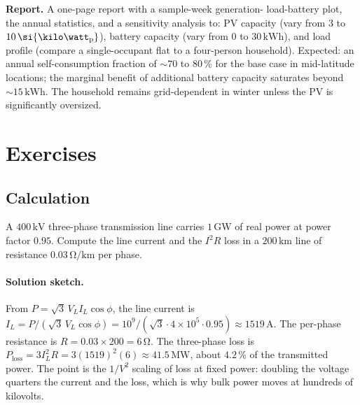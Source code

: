 \begin{project}
\textbf{Report.} A one-page report with a sample-week generation-
load-battery plot, the annual statistics, and a sensitivity analysis
to: PV capacity (vary from $3$ to $10\,\si{\kilo\watt
\textsubscript{p}}$), battery capacity (vary from $0$ to $30\,\si{
\kilo\watt\hour}$), and load profile (compare a single-occupant flat
to a four-person household). Expected: an annual self-consumption
fraction of $\sim 70$ to $80\,\%$ for the base case in mid-latitude
locations; the marginal benefit of additional battery capacity
saturates beyond $\sim 15\,\si{\kilo\watt\hour}$. The household
remains grid-dependent in winter unless the PV is significantly
oversized.
\end{project}

\section{Exercises}

\subsection*{Calculation}

\begin{exercise}
A $400\,\si{\kilo\volt}$ three-phase transmission line carries
$1\,\si{\giga\watt}$ of real power at power factor $0.95$. Compute
the line current and the $I^{2}R$ loss in a $200\,\si{\kilo\meter}$
line of resistance $0.03\,\si{\ohm\per\kilo\meter}$ per phase.
\paragraph{Solution sketch.}
From $P = \sqrt{3}\,V_L I_L \cos\phi$, the line current is $I_L =
P/(\sqrt{3}\,V_L\cos\phi) = 10^9/(\sqrt{3}\cdot 4\times10^5\cdot 0.95)
\approx 1519\,\si{\ampere}$. The per-phase resistance is $R = 0.03
\times 200 = 6\,\si{\ohm}$. The three-phase loss is $P_{\text{loss}} =
3 I_L^2 R = 3(1519)^2(6) \approx 41.5\,\si{\mega\watt}$, about $4.2\,\%$
of the transmitted power. The point is the $1/V^2$ scaling of loss at
fixed power: doubling the voltage quarters the current and the loss,
which is why bulk power moves at hundreds of kilovolts.
\end{exercise}

